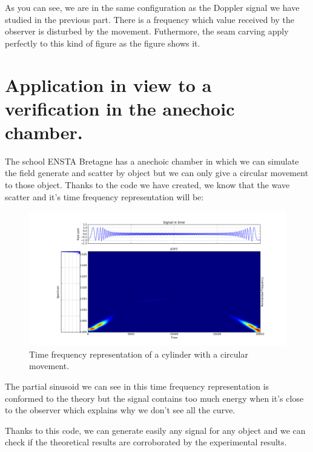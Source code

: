 As you can see, we are in the same configuration as the Doppler signal we have studied in the previous part. There is a frequency which value received by the observer is disturbed by the movement. Futhermore, the seam carving apply perfectly to this kind of figure as the figure \label{SpectrogramObjMov_LawFound} shows it.

\section{Application in view to a verification in the anechoic chamber.}

The school ENSTA Bretagne has a anechoic chamber in which we can simulate the field generate and scatter by object but we can only give a circular movement to those object. Thanks to the code we have created, we know that the wave scatter and it's time frequency representation will be:

\begin{figure}[H]
\centering
    \includegraphics[scale=0.35,angle=0]{Images/TFR3.png}
    \caption{Time frequency representation of a cylinder with a circular movement.}
    \label{fig:TFR3}
\end{figure}

The partial sinusoid we can see in this time frequency representation is conformed to the theory but the signal contains too much energy when it's close to the observer which explains why we don't see all the curve.

Thanks to this code, we can generate easily any signal for any object and we can check if the theoretical results are corroborated by the experimental results.


